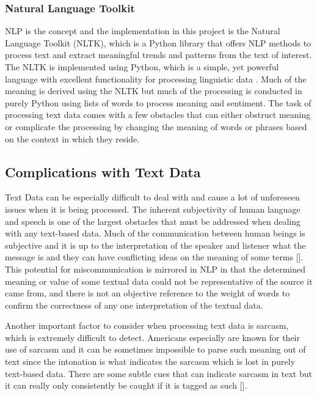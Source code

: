 \subsubsection{Natural Language Toolkit}
NLP is the concept and the implementation in this project is the Natural Language Toolkit (NLTK), which is a Python library that offers NLP methods to process text and extract meaningful trends and patterns from the text of interest.
The NLTK is implemented using Python, which is a simple, yet powerful language with excellent functionality for processing linguistic data \cite{bird2004nltk}.
Much of the meaning is derived using the NLTK but much of the processing is conducted in purely Python using lists of words to process meaning and sentiment.
The task of processing text data comes with a few obstacles that can either obstruct meaning or complicate the processing by changing the meaning of words or phrases based on the context in which they reside.

\subsection{Complications with Text Data}
Text Data can be especially difficult to deal with and cause a lot of unforeseen issues when it is being processed.
The inherent subjectivity of human language and speech is one of the largest obstacles that must be addressed when dealing with any text-based data.
Much of the communication between human beings is subjective and it is up to the interpretation of the speaker and listener what the message is and they can have conflicting ideas on the meaning of some terms [\cite{aggarwal2012mining}].
This potential for miscommunication is mirrored in NLP in that the determined meaning or value of some textual data could not be representative of the source it came from, and there is not an objective reference to the weight of words to confirm the correctness of any one interpretation of the textual data.

Another important factor to consider when processing text data is sarcasm, which is extremely difficult to detect.
Americans especially are known for their use of sarcasm and it can be sometimes impossible to parse such meaning out of text since the intonation is what indicates the sarcasm which is lost in purely text-based data.
There are some subtle cues that can indicate sarcasm in text but it can really only consistently be caught if it is tagged as such [\cite{riloff2013sarcasm}].

